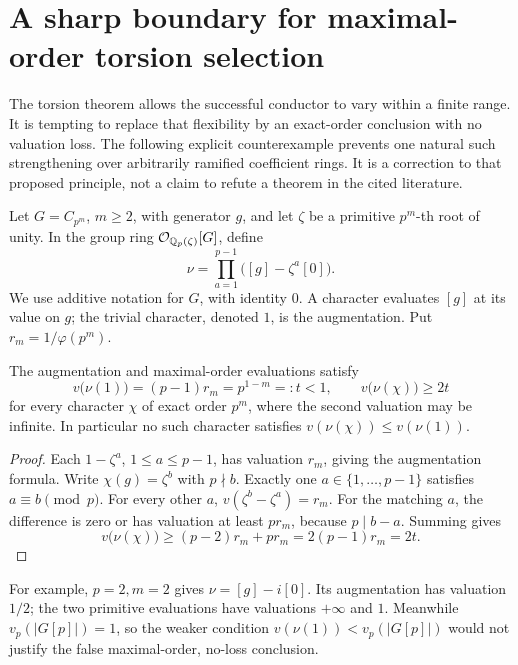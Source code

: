 \section{A sharp boundary for maximal-order torsion selection}
\label{sec:counterexample}

The torsion theorem allows the successful conductor to vary within a
finite range. It is tempting to replace that flexibility by an
exact-order conclusion with no valuation loss. The following explicit
counterexample prevents one natural such strengthening over arbitrarily
ramified coefficient rings. It is a correction to that proposed principle,
not a claim to refute a theorem in the cited literature.

Let \(G=C_{p^m}\), \(m\ge2\), with generator \(g\), and let \(\zeta\)
be a primitive \(p^m\)-th root of unity. In the group ring
\(\mathcal O_{\mathbb Q_p(\zeta)}[G]\), define
\[
 \nu=\prod_{a=1}^{p-1}\bigl([g]-\zeta^a[0]\bigr).
\]
We use additive notation for \(G\), with identity \(0\).
A character evaluates \([g]\) at its value on \(g\); the trivial
character, denoted \(1\), is the augmentation. Put
\(r_m=1/\varphi(p^m)\).

\begin{proposition}
\label{prop:maximal-order-counterexample}
The augmentation and maximal-order evaluations satisfy
\[
 v\bigl(\nu(1)\bigr)=(p-1)r_m=p^{1-m}=:t<1,
 \qquad
 v\bigl(\nu(\chi)\bigr)\ge2t
\]
for every character \(\chi\) of exact order \(p^m\), where the second
valuation may be infinite. In particular no such character satisfies
\(v(\nu(\chi))\le v(\nu(1))\).
\end{proposition}

\begin{proof}
Each \(1-\zeta^a\), \(1\le a\le p-1\), has valuation \(r_m\), giving
the augmentation formula. Write \(\chi(g)=\zeta^b\) with \(p\nmid b\).
Exactly one \(a\in\{1,\ldots,p-1\}\) satisfies \(a\equiv b\pmod p\).
For every other \(a\), \(v(\zeta^b-\zeta^a)=r_m\). For the matching
\(a\), the difference is zero or has valuation at least \(p r_m\),
because \(p\mid b-a\). Summing gives
\[
 v\bigl(\nu(\chi)\bigr)\ge (p-2)r_m+p r_m=2(p-1)r_m=2t.
\]
\end{proof}

For example, \(p=2,m=2\) gives
\(\nu=[g]-i[0]\). Its augmentation has valuation \(1/2\);
the two primitive evaluations have valuations \(+\infty\) and \(1\).
Meanwhile \(v_p(|G[p]|)=1\), so the weaker condition
\(v(\nu(1))<v_p(|G[p]|)\) would not justify the false maximal-order,
no-loss conclusion.

